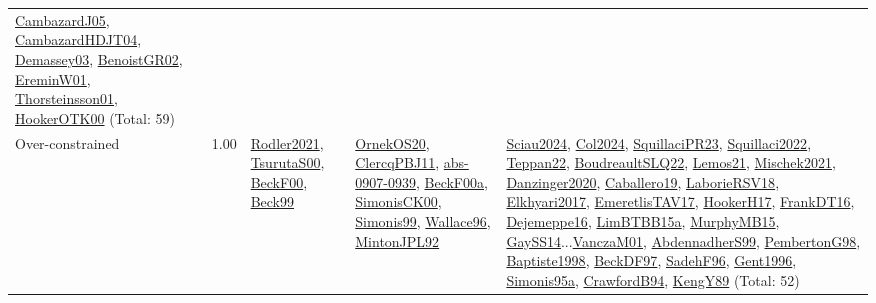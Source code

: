 {\begin{longtable}{p{3cm}r>{\raggedright\arraybackslash}p{6cm}>{\raggedright\arraybackslash}p{6cm}>{\raggedright\arraybackslash}p{8cm}}
\hyperref[detail:CambazardJ05]{CambazardJ05}, \hyperref[detail:CambazardHDJT04]{CambazardHDJT04}, \hyperref[detail:Demassey03]{Demassey03}, \hyperref[detail:BenoistGR02]{BenoistGR02}, \hyperref[detail:EreminW01]{EreminW01}, \hyperref[detail:Thorsteinsson01]{Thorsteinsson01}, \hyperref[detail:HookerOTK00]{HookerOTK00} (Total: 59)\\
\index{Over-constrained}\index{Concepts!Over-constrained}Over-constrained &  1.00 & \hyperref[detail:Rodler2021]{Rodler2021}, \hyperref[detail:TsurutaS00]{TsurutaS00}, \hyperref[detail:BeckF00]{BeckF00}, \hyperref[detail:Beck99]{Beck99} & \hyperref[detail:OrnekOS20]{OrnekOS20}, \hyperref[detail:ClercqPBJ11]{ClercqPBJ11}, \hyperref[detail:abs-0907-0939]{abs-0907-0939}, \hyperref[detail:BeckF00a]{BeckF00a}, \hyperref[detail:SimonisCK00]{SimonisCK00}, \hyperref[detail:Simonis99]{Simonis99}, \hyperref[detail:Wallace96]{Wallace96}, \hyperref[detail:MintonJPL92]{MintonJPL92} & \hyperref[detail:Sciau2024]{Sciau2024}, \hyperref[detail:Col2024]{Col2024}, \hyperref[detail:SquillaciPR23]{SquillaciPR23}, \hyperref[detail:Squillaci2022]{Squillaci2022}, \hyperref[detail:Teppan22]{Teppan22}, \hyperref[detail:BoudreaultSLQ22]{BoudreaultSLQ22}, \hyperref[detail:Lemos21]{Lemos21}, \hyperref[detail:Mischek2021]{Mischek2021}, \hyperref[detail:Danzinger2020]{Danzinger2020}, \hyperref[detail:Caballero19]{Caballero19}, \hyperref[detail:LaborieRSV18]{LaborieRSV18}, \hyperref[detail:Elkhyari2017]{Elkhyari2017}, \hyperref[detail:EmeretlisTAV17]{EmeretlisTAV17}, \hyperref[detail:HookerH17]{HookerH17}, \hyperref[detail:FrankDT16]{FrankDT16}, \hyperref[detail:Dejemeppe16]{Dejemeppe16}, \hyperref[detail:LimBTBB15a]{LimBTBB15a}, \hyperref[detail:MurphyMB15]{MurphyMB15}, \hyperref[detail:GaySS14]{GaySS14}...\hyperref[detail:VanczaM01]{VanczaM01}, \hyperref[detail:AbdennadherS99]{AbdennadherS99}, \hyperref[detail:PembertonG98]{PembertonG98}, \hyperref[detail:Baptiste1998]{Baptiste1998}, \hyperref[detail:BeckDF97]{BeckDF97}, \hyperref[detail:SadehF96]{SadehF96}, \hyperref[detail:Gent1996]{Gent1996}, \hyperref[detail:Simonis95a]{Simonis95a}, \hyperref[detail:CrawfordB94]{CrawfordB94}, \hyperref[detail:KengY89]{KengY89} (Total: 52)\\

\end{longtable}}
